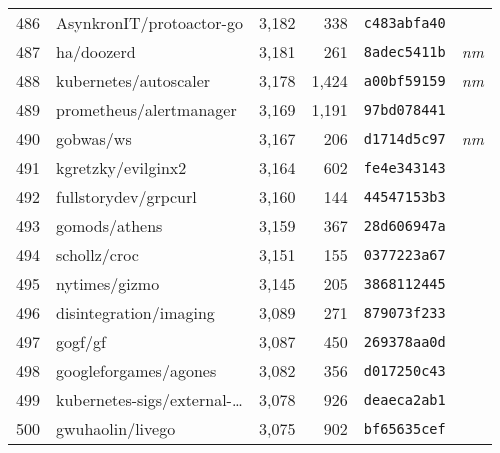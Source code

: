 {\begin{supertabular}{llrrll}
        486 &           AsynkronIT/protoactor-go &  3,182 &    338 &  \texttt{c483abfa40} &              \\
        487 &                         ha/doozerd &  3,181 &    261 &  \texttt{8adec5411b} &  \textit{nm} \\
        488 &              kubernetes/autoscaler &  3,178 &  1,424 &  \texttt{a00bf59159} &  \textit{nm} \\
        489 &            prometheus/alertmanager &  3,169 &  1,191 &  \texttt{97bd078441} &              \\
        490 &                          gobwas/ws &  3,167 &    206 &  \texttt{d1714d5c97} &  \textit{nm} \\
        491 &                 kgretzky/evilginx2 &  3,164 &    602 &  \texttt{fe4e343143} &              \\
        492 &               fullstorydev/grpcurl &  3,160 &    144 &  \texttt{44547153b3} &              \\
        493 &                      gomods/athens &  3,159 &    367 &  \texttt{28d606947a} &              \\
        494 &                       schollz/croc &  3,151 &    155 &  \texttt{0377223a67} &              \\
        495 &                      nytimes/gizmo &  3,145 &    205 &  \texttt{3868112445} &              \\
        496 &             disintegration/imaging &  3,089 &    271 &  \texttt{879073f233} &              \\
        497 &                            gogf/gf &  3,087 &    450 &  \texttt{269378aa0d} &              \\
        498 &              googleforgames/agones &  3,082 &    356 &  \texttt{d017250c43} &              \\
        499 &    kubernetes-sigs/external-\ldots &  3,078 &    926 &  \texttt{deaeca2ab1} &              \\
        500 &                   gwuhaolin/livego &  3,075 &    902 &  \texttt{bf65635cef} &              \\

    \end{supertabular}
}